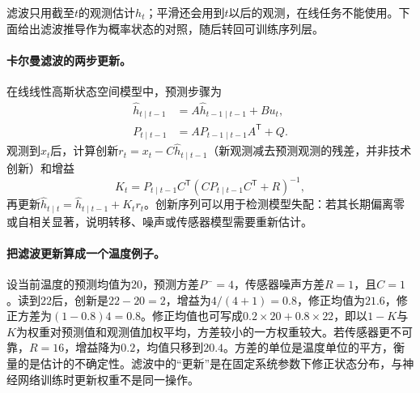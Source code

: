 滤波只用截至$t$的观测估计$h_t$；平滑还会用到$t$以后的观测，在线任务不能使用。下面给出滤波推导作为概率状态的对照，随后转回可训练序列层。

\paragraph{卡尔曼滤波的两步更新。}
在线线性高斯状态空间模型中，预测步骤为
\begin{align}
 \hat h_{t\mid t-1}&=A\hat h_{t-1\mid t-1}+Bu_t,\\
 P_{t\mid t-1}&=AP_{t-1\mid t-1}A^{\mathsf T}+Q.
\end{align}
观测到$x_t$后，计算创新$r_t=x_t-C\hat h_{t\mid t-1}$（新观测减去预测观测的残差，并非技术创新）和增益
\begin{equation}
 K_t=P_{t\mid t-1}C^{\mathsf T}(CP_{t\mid t-1}C^{\mathsf T}+R)^{-1},
\end{equation}
再更新$\hat h_{t\mid t}=\hat h_{t\mid t-1}+K_tr_t$。创新序列可以用于检测模型失配：若其长期偏离零或自相关显著，说明转移、噪声或传感器模型需要重新估计。

\paragraph{把滤波更新算成一个温度例子。}
设当前温度的预测均值为$20$，预测方差$P^-=4$，传感器噪声方差$R=1$，且$C=1$。读到$22$后，创新是$22-20=2$，增益为$4/(4+1)=0.8$，修正均值为$21.6$，修正方差为$(1-0.8)4=0.8$。修正均值也可写成$0.2\times20+0.8\times22$，即以$1-K$与$K$为权重对预测值和观测值加权平均，方差较小的一方权重较大。若传感器更不可靠，$R=16$，增益降为$0.2$，均值只移到$20.4$。方差的单位是温度单位的平方，衡量的是估计的不确定性。滤波中的“更新”是在固定系统参数下修正状态分布，与神经网络训练时更新权重不是同一操作。

